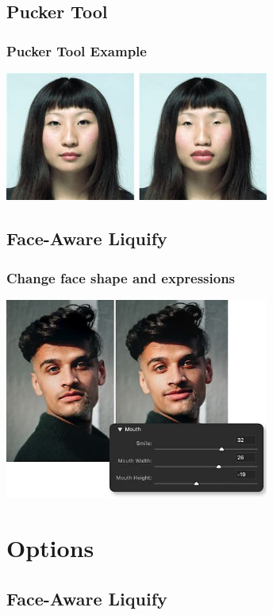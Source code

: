 \documentclass{beamer}
\begin{document}
\subsection{Pucker Tool}		
\begin{frame}
	\frametitle{Pucker Tool Example}
	\begin{center}
		\includegraphics[width=0.65\textwidth]{images/liquify - pucker.jpg}
	\end{center}
\end{frame}

\subsection{Face-Aware Liquify}		
\begin{frame}
	\frametitle{Change face shape and expressions}
	\begin{center}
		\includegraphics[width=0.65\textwidth]{images/liquify - face.png}
	\end{center}
\end{frame}


\section{Options}

\subsection{Face-Aware Liquify}		
\end{document}
